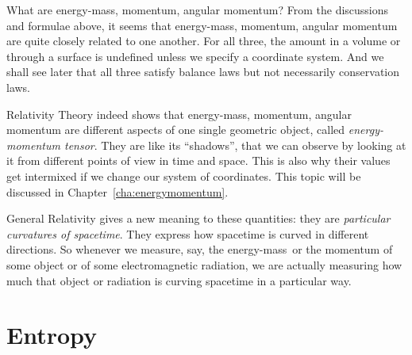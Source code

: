 \documentclass[a4paper,12pt,%
onecolumn,oneside,%
british%
]{memoir}
\newcommand{\mynotew}[1]{{\footnotesize\color{midgrey}\faIcon{tools}\ #1}}
\renewcommand*{\|}[1][]{\nonscript\:#1\vert\nonscript\:\mathopen{}}
\newcommand*{\sect}{\S}%
\newcommand*{\chap}{Chapter}%
\newcommand*{\energym}{energy-mass}
\begin{document}
\begin{extra}{{What are \energym, momentum, angular momentum?}}
From the discussions and formulae above, it seems that \energym, momentum, angular momentum are quite closely related to one another. For all three, the amount in a volume or through a surface is undefined unless we specify a coordinate system. And we shall see later that all three satisfy balance laws but not necessarily conservation laws.

  Relativity Theory indeed shows that \energym, momentum, angular momentum are different aspects of one single geometric object, called \emph{energy-momentum tensor}. They are like its \enquote{shadows}, that we can observe by looking at it from different points of view in time and space. This is also why their values get intermixed if we change our system of coordinates. This topic will be discussed in \chap~\ref{cha:energymomentum}.

  General Relativity gives a new meaning to these quantities: they are \emph{particular curvatures of spacetime}. They express how spacetime is curved in different directions. So whenever we measure, say, the \energym\ or the momentum of some object or of some electromagnetic radiation, we are actually measuring how much that object or radiation is curving spacetime in a particular way. %
\end{extra}
%

\section{Entropy}
\label{sec:intro_entropy}
\end{document}

